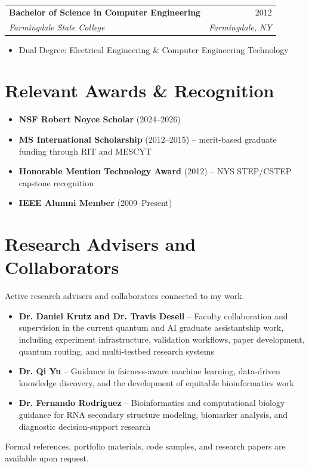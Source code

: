 \documentclass[10pt]{article}
\makeatletter
\newcommand{\resumeItem}[1]{\item\small{#1}}
\newcommand{\resumeSubheading}[4]{
  \vspace{4pt}
  \noindent
  \begin{tabular*}{\textwidth}[t]{@{}l@{\extracolsep{\fill}}r@{}}
    \textbf{#1} & #2 \\
    \textit{\small #3} & \textit{\small #4} \\
  \end{tabular*}\vspace{-4pt}
}
\makeatother
\begin{document}
\resumeSubheading
{Bachelor of Science in Computer Engineering}{2012}
{Farmingdale State College}{Farmingdale, NY}
\begin{itemize}[leftmargin=1.2em]
\resumeItem{Dual Degree: Electrical Engineering \& Computer Engineering Technology}
\end{itemize}


\section{Relevant Awards \& Recognition}

\begin{itemize}[leftmargin=*]
\item \small{\textbf{NSF Robert Noyce Scholar} (2024--2026)}
\item \small{\textbf{MS International Scholarship} (2012--2015) -- merit-based graduate funding through RIT and MESCYT}
\item \small{\textbf{Honorable Mention Technology Award} (2012) -- NYS STEP/CSTEP capstone recognition}
\item \small{\textbf{IEEE Alumni Member} (2009--Present)}
\end{itemize}


\section{Research Advisers and Collaborators}

Active research advisers and collaborators connected to my work.

\begin{itemize}[leftmargin=*]
\item \small{\textbf{Dr. Daniel Krutz and Dr. Travis Desell} -- Faculty collaboration and supervision in the current quantum and AI graduate assistantship work, including experiment infrastructure, validation workflows, paper development, quantum routing, and multi-testbed research systems}
\item \small{\textbf{Dr. Qi Yu} -- Guidance in fairness-aware machine learning, data-driven knowledge discovery, and the development of equitable bioinformatics work}
\item \small{\textbf{Dr. Fernando Rodriguez} -- Bioinformatics and computational biology guidance for RNA secondary structure modeling, biomarker analysis, and diagnostic decision-support research}
\end{itemize}

\vspace{8pt}
\small{Formal references, portfolio materials, code samples, and research papers are available upon request.}
\end{document}
